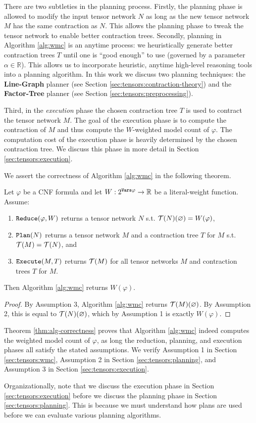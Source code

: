 There are two subtleties in the planning process. 
Firstly, the planning phase is allowed to modify the input tensor network $N$ as long as the new tensor network $M$ has the same contraction as $N$. 
This allows the planning phase to tweak the tensor network to enable better contraction trees.
Secondly, planning in Algorithm \ref{alg:wmc} is an anytime process: we heuristically generate better contraction trees $T$ until one is ``good enough'' to use (governed by a parameter $\alpha \in \mathbb{R}$). 
This allows us to incorporate heuristic, anytime high-level reasoning tools into a planning algorithm. 
In this work we discuss two planning techniques: the \textbf{Line-Graph} planner (see Section \ref{sec:tensors:contraction-theory}) and the \textbf{Factor-Tree} planner (see Section \ref{sec:tensors:preprocessing}).

Third, in the \emph{execution} phase the chosen contraction tree $T$ is used to contract the tensor network $M$.
The goal of the execution phase is to compute the contraction of $M$ and thus compute the $W$-weighted model count of $\varphi$. The computation cost of the execution phase is heavily determined by the chosen contraction tree. We discuss this phase in more detail in Section \ref{sec:tensors:execution}.

We assert the correctness of Algorithm \ref{alg:wmc} in the following theorem.
\begin{theorem}
\label{thm:alg-correctness}
Let $\varphi$ be a CNF formula and let $W: 2^{\texttt{\upshape Vars}{\varphi}} \rightarrow \mathbb{R}$ be a literal-weight function.
    Assume:
    \begin{enumerate}
        \item $\texttt{\upshape Reduce}(\varphi, W)$ returns a tensor network $N$ s.t. $\mathcal{T}(N)(\varnothing) = W(\varphi)$,
        \item $\texttt{\upshape Plan}(N)$ returns a tensor network $M$ and a contraction tree $T$ for $M$ s.t. $\mathcal{T}(M) = \mathcal{T}(N)$, and
        \item $\texttt{\upshape Execute}(M, T)$ returns $\mathcal{T}(M)$ for all tensor networks $M$ and contraction trees $T$ for $M$.
    \end{enumerate}
Then Algorithm \ref{alg:wmc} returns $W(\varphi)$.
\end{theorem}
\begin{proof}
By Assumption 3, Algorithm \ref{alg:wmc} returns $\mathcal{T}(M)(\varnothing)$. 
By Assumption 2, this is equal to $\mathcal{T}(N)(\varnothing)$, which by Assumption 1 is exactly $W(\varphi)$.
\end{proof}
Theorem \ref{thm:alg-correctness} proves that Algorithm \ref{alg:wmc} indeed computes the weighted model count of $\varphi$, as long the reduction, planning, and execution phases all satisfy the stated assumptions. We verify Assumption 1 in Section \ref{sec:tensors:wmc}, Assumption 2 in Section \ref{sec:tensors:planning}, and Assumption 3 in Section \ref{sec:tensors:execution}.

Organizationally, note that we discuss the execution phase in Section \ref{sec:tensors:execution} before we discuss the planning phase in Section \ref{sec:tensors:planning}. 
This is because we must understand how plans are used before we can evaluate various planning algorithms.
